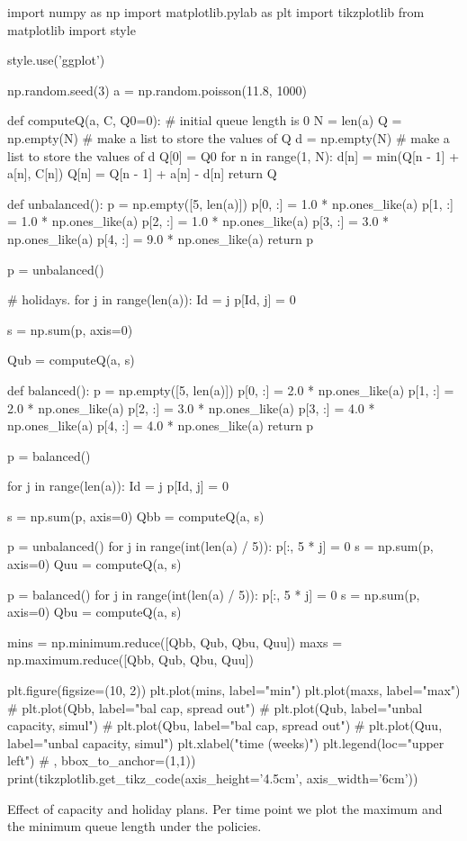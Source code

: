 \begin{marginfigure}
\begin{pycode}[simulation]
import numpy as np
import matplotlib.pylab as plt
import tikzplotlib
from matplotlib import style

style.use('ggplot')

np.random.seed(3)
a = np.random.poisson(11.8, 1000)


def computeQ(a, C, Q0=0):  # initial queue length is 0
    N = len(a)
    Q = np.empty(N)  # make a list to store the values of  Q
    d = np.empty(N)  # make a list to store the values of  d
    Q[0] = Q0
    for n in range(1, N):
        d[n] = min(Q[n - 1] + a[n], C[n])
        Q[n] = Q[n - 1] + a[n] - d[n]
    return Q


def unbalanced():
    p = np.empty([5, len(a)])
    p[0, :] = 1.0 * np.ones_like(a)
    p[1, :] = 1.0 * np.ones_like(a)
    p[2, :] = 1.0 * np.ones_like(a)
    p[3, :] = 3.0 * np.ones_like(a)
    p[4, :] = 9.0 * np.ones_like(a)
    return p


p = unbalanced()

# holidays.
for j in range(len(a)):
    Id = j %
    p[Id, j] = 0

s = np.sum(p, axis=0)

Qub = computeQ(a, s)


def balanced():
    p = np.empty([5, len(a)])
    p[0, :] = 2.0 * np.ones_like(a)
    p[1, :] = 2.0 * np.ones_like(a)
    p[2, :] = 3.0 * np.ones_like(a)
    p[3, :] = 4.0 * np.ones_like(a)
    p[4, :] = 4.0 * np.ones_like(a)
    return p


p = balanced()

for j in range(len(a)):
    Id = j %
    p[Id, j] = 0

s = np.sum(p, axis=0)
Qbb = computeQ(a, s)

p = unbalanced()
for j in range(int(len(a) / 5)):
    p[:, 5 * j] = 0
s = np.sum(p, axis=0)
Quu = computeQ(a, s)

p = balanced()
for j in range(int(len(a) / 5)):
    p[:, 5 * j] = 0
s = np.sum(p, axis=0)
Qbu = computeQ(a, s)

mins = np.minimum.reduce([Qbb, Qub, Qbu, Quu])
maxs = np.maximum.reduce([Qbb, Qub, Qbu, Quu])


plt.figure(figsize=(10, 2))
plt.plot(mins, label="min")
plt.plot(maxs, label="max")
# plt.plot(Qbb, label="bal cap, spread out")
# plt.plot(Qub, label="unbal capacity, simul")
# plt.plot(Qbu, label="bal cap, spread out")
# plt.plot(Quu, label="unbal capacity, simul")
plt.xlabel("time (weeks)")
plt.legend(loc="upper left")  # , bbox_to_anchor=(1,1))
print(tikzplotlib.get_tikz_code(axis_height='4.5cm', axis_width='6cm'))
\end{pycode}
\caption{Effect of capacity and holiday plans.
Per time point  we plot the maximum and the minimum queue length under the policies.
}
\label{fig:balanced}
\end{marginfigure}



